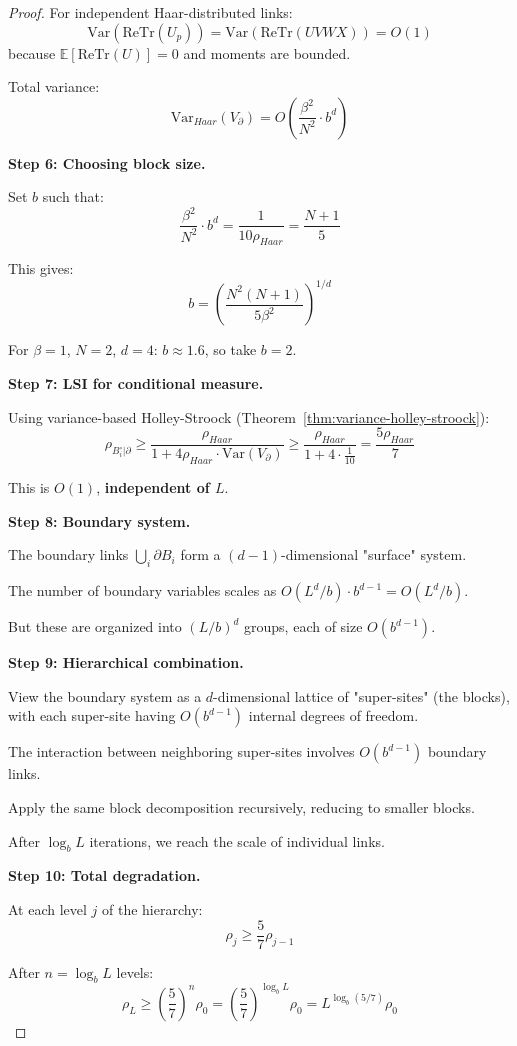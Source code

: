 \begin{proof}
For independent Haar-distributed links:
\[
\mathrm{Var}(\mathrm{Re}\mathrm{Tr}(U_p)) = \mathrm{Var}(\mathrm{Re}\mathrm{Tr}(UVWX)) = O(1)
\]
because $\mathbb{E}[\mathrm{Re}\mathrm{Tr}(U)] = 0$ and moments are bounded.

Total variance:
\[
\mathrm{Var}_{Haar}(V_\partial) = O\left(\frac{\beta^2}{N^2} \cdot b^d\right)
\]

\textbf{Step 6: Choosing block size.}

Set $b$ such that:
\[
\frac{\beta^2}{N^2} \cdot b^d = \frac{1}{10 \rho_{Haar}} = \frac{N+1}{5}
\]

This gives:
\[
b = \left(\frac{N^2(N+1)}{5\beta^2}\right)^{1/d}
\]

For $\beta = 1$, $N = 2$, $d = 4$: $b \approx 1.6$, so take $b = 2$.

\textbf{Step 7: LSI for conditional measure.}

Using variance-based Holley-Stroock (Theorem~\ref{thm:variance-holley-stroock}):
\[
\rho_{B_i^\circ | \partial} \geq \frac{\rho_{Haar}}{1 + 4\rho_{Haar} \cdot \mathrm{Var}(V_\partial)} \geq \frac{\rho_{Haar}}{1 + 4 \cdot \frac{1}{10}} = \frac{5\rho_{Haar}}{7}
\]

This is $O(1)$, \textbf{independent of $L$}.

\textbf{Step 8: Boundary system.}

The boundary links $\bigcup_i \partial B_i$ form a $(d-1)$-dimensional "surface" system.

The number of boundary variables scales as $O(L^d / b) \cdot b^{d-1} = O(L^d / b)$.

But these are organized into $(L/b)^d$ groups, each of size $O(b^{d-1})$.

\textbf{Step 9: Hierarchical combination.}

View the boundary system as a $d$-dimensional lattice of "super-sites" (the blocks), 
with each super-site having $O(b^{d-1})$ internal degrees of freedom.

The interaction between neighboring super-sites involves $O(b^{d-1})$ boundary links.

Apply the same block decomposition recursively, reducing to smaller blocks.

After $\log_b L$ iterations, we reach the scale of individual links.

\textbf{Step 10: Total degradation.}

At each level $j$ of the hierarchy:
\[
\rho_j \geq \frac{5}{7} \rho_{j-1}
\]

After $n = \log_b L$ levels:
\[
\rho_L \geq \left(\frac{5}{7}\right)^n \rho_0 = \left(\frac{5}{7}\right)^{\log_b L} \rho_0 = L^{\log_b(5/7)} \rho_0
\]


\end{proof}
